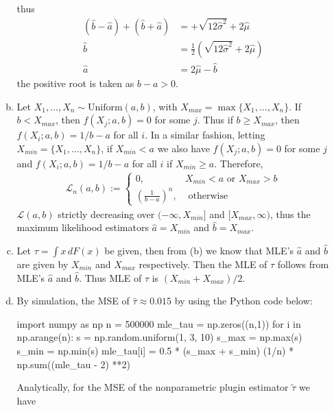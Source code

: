 \documentclass[a4paper,10pt]{article}
\theoremstyle{definition}
\begin{document}
\begin{enumerate}
\begin{enumerate}[(a)]
thus
\begin{align*}
(\hat{b}-\hat{a})+(\hat{b}+\hat{a}) &= +\sqrt{12\hat{\sigma}^2}+2\hat{\mu}\\
\hat{b} &= \frac{1}{2}\left(\sqrt{12\hat{\sigma}^2}+2\hat{\mu}\right)\\
\hat{a} &=2\hat{\mu}-\hat{b }
\end{align*}
the positive root is taken as $b-a>0$.
\item Let $X_1,\ldots, X_n \sim \text{Uniform}(a,b)$, with $X_{max}=\max \{X_1,\ldots, X_n\}$. If $b < X_{max}$, then $f(X_j;a,b)=0$ for some $j$. Thus if $b \geq X_{max}$, then $f(X_i;a,b)=1/b-a$ for all $i$. In a similar fashion, letting $X_{min} = \{X_1,\ldots, X_n\}$, if $X_{min}<a$ we also have $f(X_j;a,b)=0$ for some $j$ and $f(X_i;a,b)=1/b-a$ for all $i$ if $X_{min} \geq a$. Therefore,
\begin{align*}
\mathcal{L}_n(a,b):=\begin{cases}
0, & X_{min} < a \text{ or }X_{max} >  b \\
\left(\frac{1}{b-a}\right)^n, & \text{ otherwise }%
\end{cases}
\end{align*}
$\mathcal{L}(a,b)$ strictly decreasing over $(-\infty,X_{min}]$ and $[X_{max},\infty)$, thus the maximum likelihood estimators $\hat{a}=X_{min}$ and $\hat{b}=X_{max}$.

\item Let $\tau = \int x \,dF(x)$ be given, then from (b) we know that {\sffamily MLE}'s $\hat{a}$ and $\hat{b}$ are given by $X_{min}$ and $X_{max}$ respectively. Then the {\sffamily MLE} of $\tau$ follows from {\sffamily MLE}'s $\hat{a}$ and $\hat{b}$. Thus {\sffamily MLE} of $\tau$ is $(X_{min} + X_{max})/2$. 
\item By simulation, the {\sffamily MSE} of $\hat{\tau} \approx 0.015$ by using the Python code below:
\begin{python}
import numpy as np
n = 500000
mle_tau = np.zeros((n,1))
for i in np.arange(n):
    s = np.random.uniform(1, 3, 10)
    s_max = np.max(s)
    s_min = np.min(s)
    mle_tau[i] = 0.5 * (s_max + s_min)
(1/n) * np.sum((mle_tau - 2) **2)    
\end{python}

Analytically, for the {\sffamily MSE} of the  nonparametric plugin estimator $\tilde{\tau}$ we have


\end{enumerate}
\end{enumerate}
\end{document}
